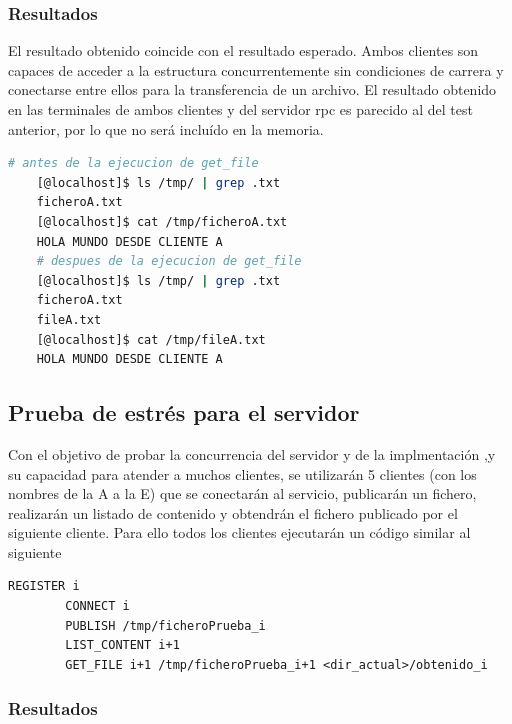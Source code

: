 \documentclass[]{article}
\begin{document}
\subsubsection{Resultados}
\label{subsubsection:resultados_2_clientes}
El resultado obtenido coincide con el resultado esperado. Ambos clientes son capaces de acceder a la estructura concurrentemente sin condiciones de carrera y conectarse entre ellos para la transferencia de un archivo. El resultado obtenido en las terminales de ambos clientes y del servidor rpc es parecido al del test anterior, por lo que no será incluído en la memoria. 

\begin{center}
    \begin{lstlisting}[caption=Resultado de la transferencia del archivo, language=bash]
    # antes de la ejecucion de get_file
    [@localhost]$ ls /tmp/ | grep .txt
    ficheroA.txt
    [@localhost]$ cat /tmp/ficheroA.txt
    HOLA MUNDO DESDE CLIENTE A
    # despues de la ejecucion de get_file
    [@localhost]$ ls /tmp/ | grep .txt
    ficheroA.txt
    fileA.txt
    [@localhost]$ cat /tmp/fileA.txt
    HOLA MUNDO DESDE CLIENTE A
    \end{lstlisting}
\end{center}

\subsection{Prueba de estrés para el servidor}
\label{subsec:estres}
Con el objetivo de probar la concurrencia del servidor y de la implmentación ,y su capacidad para atender a muchos clientes, se utilizarán 5 clientes (con los nombres de la A a la E) que se conectarán al servicio, publicarán un fichero, realizarán un listado de contenido y obtendrán el fichero publicado por el siguiente cliente.
Para ello todos los clientes ejecutarán un código similar al siguiente
\begin{center}
    \begin{lstlisting}[caption=Operaciones a realizar por cada cliente i]
        REGISTER i
        CONNECT i
        PUBLISH /tmp/ficheroPrueba_i
        LIST_CONTENT i+1 
        GET_FILE i+1 /tmp/ficheroPrueba_i+1 <dir_actual>/obtenido_i
    \end{lstlisting}
\end{center}

\subsubsection{Resultados}
\label{subsubsection:resultados_5_clientes}
\end{document}
